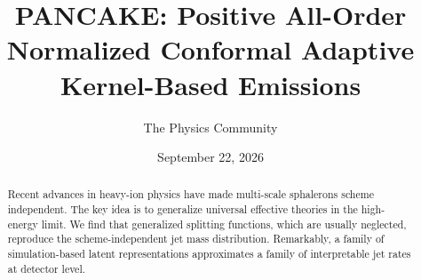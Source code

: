 \documentclass[11pt]{article}
\title{PANCAKE: Positive All-Order Normalized Conformal Adaptive Kernel-Based Emissions}
\author{The Physics Community}
\date{September 22, 2026}
\begin{document}
\maketitle
\begin{abstract}
Recent advances in heavy-ion physics have made multi-scale sphalerons
scheme independent. The key idea is to generalize universal effective
theories in the high-energy limit. We find that generalized splitting
functions, which are usually neglected, reproduce the scheme-independent
jet mass distribution. Remarkably, a family of simulation-based latent
representations approximates a family of interpretable jet rates at
detector level.
\end{abstract}
\tableofcontents




\nocite{*}


\end{document}
